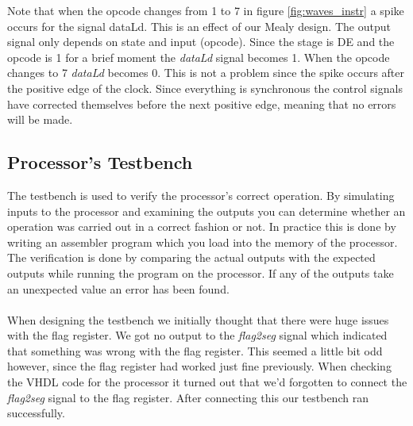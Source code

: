 \documentclass[a4paper,11pt]{article}
\begin{document}
Note that when the opcode changes from 1 to 7 in figure \ref{fig:waves_instr} a spike occurs for the signal dataLd. This is an effect of our Mealy design. The output signal only depends on state and input (opcode). Since the stage is DE and the opcode is 1 for a brief moment the \textit{dataLd} signal becomes 1. When the opcode changes to 7 \textit{dataLd} becomes 0. This is not a problem since the spike occurs after the positive edge of the clock. Since everything is synchronous the control signals have corrected themselves before the next positive edge, meaning that no errors will be made. 

\subsection{Processor's Testbench}

The testbench is used to verify the processor's correct operation. By simulating inputs to the processor and examining the outputs you can determine whether an operation was carried out in a correct fashion or not. In practice this is done by writing an assembler program which you load into the memory of the processor. The verification is done by comparing the actual outputs with the expected outputs while running the program on the processor. If any of the outputs take an unexpected value an error has been found.
\\\\
When designing the testbench we initially thought that there were huge issues with the flag register. We got no output to the \textit{flag2seg} signal which indicated that something was wrong with the flag register. This seemed a little bit odd however, since the flag register had worked just fine previously. When checking the VHDL code for the processor it turned out that we'd forgotten to connect the \textit{flag2seg} signal to the flag register. After connecting this our testbench ran successfully. 
\end{document}
